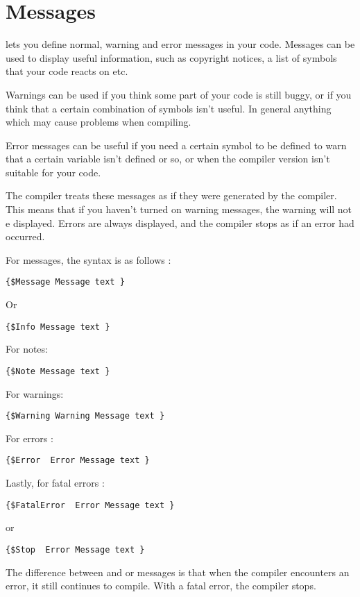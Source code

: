 \documentclass{report}
\begin{document}
\section{Messages}
\label{se:Messages}
\fpc lets you define normal, warning and error messages in your code.
Messages can be used to display useful information, such as copyright
notices, a list of symbols that your code reacts on etc.

Warnings can be used if you think some part of your code is still buggy, or
if you think that a certain combination of symbols isn't useful. In general
anything which may cause problems when compiling.

Error messages can be useful if you need a certain symbol to be defined
to warn that a certain variable isn't defined or so, or when the compiler
version isn't suitable for your code.

The compiler treats these messages as if they were generated by the
compiler. This means that if you haven't turned on warning messages, the
warning will not e displayed. Errors are always displayed, and the compiler
stops as if an error had occurred.

For messages, the syntax is as follows  :
\begin{verbatim}
{$Message Message text }
\end{verbatim}
Or
\begin{verbatim}
{$Info Message text }
\end{verbatim}
For notes:
\begin{verbatim}
{$Note Message text }
\end{verbatim}
For warnings:
\begin{verbatim}
{$Warning Warning Message text }
\end{verbatim}
For errors :
\begin{verbatim}
{$Error  Error Message text }
\end{verbatim}
Lastly, for fatal errors :
\begin{verbatim}
{$FatalError  Error Message text }
\end{verbatim}
or
\begin{verbatim}
{$Stop  Error Message text }
\end{verbatim}
The difference between  and  or 
messages is that when the compiler encounters an error, it still continues
to compile. With a fatal error, the compiler stops.
\end{document}
